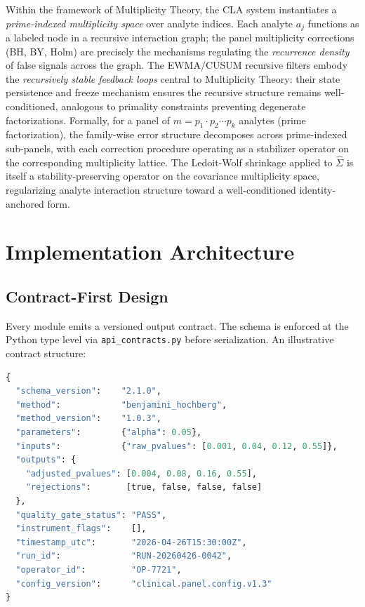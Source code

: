 \documentclass[11pt,a4paper]{article}
\begin{document}
Within the framework of Multiplicity Theory, the CLA system instantiates a
\emph{prime-indexed multiplicity space} over analyte indices. Each analyte $a_j$
functions as a labeled node in a recursive interaction graph; the panel
multiplicity corrections (BH, BY, Holm) are precisely the mechanisms regulating
the \emph{recurrence density} of false signals across the graph. The EWMA/CUSUM
recursive filters embody the \emph{recursively stable feedback loops} central to
Multiplicity Theory: their state persistence and freeze mechanism ensures the
recursive structure remains well-conditioned, analogous to primality constraints
preventing degenerate factorizations. Formally, for a panel of $m = p_1 \cdot
p_2 \cdots p_k$ analytes (prime factorization), the family-wise error structure
decomposes across prime-indexed sub-panels, with each correction procedure
operating as a stabilizer operator on the corresponding multiplicity lattice.
The Ledoit-Wolf shrinkage applied to $\hat{\Sigma}$ is itself a
stability-preserving operator on the covariance multiplicity space, regularizing
analyte interaction structure toward a well-conditioned identity-anchored form.

\section{Implementation Architecture}
\label{sec:arch}

\subsection{Contract-First Design}

Every module emits a versioned output contract. The schema is enforced at the
Python type level via \texttt{api\_contracts.py} before serialization. An
illustrative contract structure:

\begin{lstlisting}[language=Python, caption={Canonical CLA Output Contract (JSON schema)},
                   label={lst:contract}]
{
  "schema_version":    "2.1.0",
  "method":            "benjamini_hochberg",
  "method_version":    "1.0.3",
  "parameters":        {"alpha": 0.05},
  "inputs":            {"raw_pvalues": [0.001, 0.04, 0.12, 0.55]},
  "outputs": {
    "adjusted_pvalues": [0.004, 0.08, 0.16, 0.55],
    "rejections":       [true, false, false, false]
  },
  "quality_gate_status": "PASS",
  "instrument_flags":    [],
  "timestamp_utc":       "2026-04-26T15:30:00Z",
  "run_id":              "RUN-20260426-0042",
  "operator_id":         "OP-7721",
  "config_version":      "clinical.panel.config.v1.3"
}
\end{lstlisting}
\end{document}
